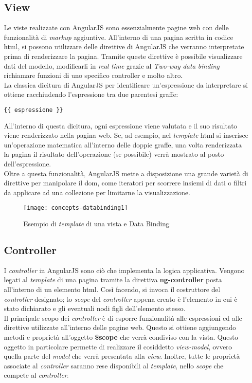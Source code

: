 \subsection{View}
Le viste realizzate con AngularJS sono essenzialmente pagine web con delle funzionalità di \emph{markup} aggiuntive. All'interno di una pagina scritta in codice \gls{html}, si possono utilizzare delle direttive di AngularJS che verranno interpretate prima di renderizzare la pagina. Tramite queste direttive è possibile visualizzare dati del modello, modificarli in \emph{real time} grazie al \emph{Two-way data binding} richiamare funzioni di uno specifico controller e molto altro.\\
La classica dicitura di AngularJS per identificare un'espressione da interpretare si ottiene racchiudendo l'espressione tra due parentesi graffe: 
\begin{verbatim}
{{ espressione }}
\end{verbatim}
All'interno di questa dicitura, ogni espressione viene valutata e il suo risultato viene renderizzato nella pagina web. Se, ad esempio, nel \emph{template} \gls{html} si inserisce un'operazione matematica all'interno delle doppie graffe, una volta renderizzata la pagina il risultato dell'operazione (se possibile) verrà mostrato al posto dell'espressione.\\
Oltre a questa funzionalità, AngularJS mette a disposizione una grande varietà di direttive per manipolare il \gls{dom}\glsfirstoccur, come iteratori per scorrere insiemi di dati o filtri da applicare ad una collezione per limitarne la visualizzazione.

\begin{figure}[!h] 
    \centering 
    \texttt{[image: concepts-databinding1]} 
    \caption{Esempio di \emph{template} di una vista e Data Binding}
\end{figure}

\subsection{Controller}
I \emph{controller} in AngularJS sono ciò che implementa la logica applicativa. Vengono legati al \emph{template} di una pagina tramite la direttiva \textbf{ng-controller} posta all'interno di un elemento \gls{html}. Così facendo, si invoca il costruttore del \emph{controller} designato; lo \emph{scope} del \emph{controller} appena creato è l'elemento in cui è stato dichiarato e gli eventuali nodi figli dell'elemento stesso.\\
Il principale scopo dei \emph{controller} è di esporre funzionalità alle espressioni ed alle direttive utilizzate all'interno delle pagine web. Questo si ottiene aggiungendo metodi e proprietà all'oggetto \textbf{\$scope} che verrà condiviso con la vista. Questo oggetto in particolare permette di realizzare il cosiddetto \emph{view-model}, ovvero quella parte del \emph{model} che verrà presentata alla \emph{view}. Inoltre, tutte le proprietà associate al \emph{controller} saranno rese disponibili al \emph{template}, nello \emph{scope} che compete al \emph{controller}.

